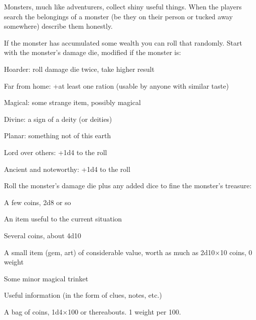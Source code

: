 Monsters, much like adventurers, collect shiny useful things. When the players search the belongings of a monster (be they on their person or tucked away somewhere) describe them honestly.

 

If the monster has accumulated some wealth you can roll that randomly. Start with the monster's damage die, modified if the monster is:

 
\startitemize[1,packed]

\item Hoarder: roll damage die twice, take higher result

 
\item Far from home: +at least one ration (usable by anyone with similar taste)

 
\item Magical: some strange item, possibly magical

 
\item Divine: a sign of a deity (or deities)

 
\item Planar: something not of this earth

 
\item Lord over others: +1d4 to the roll

 
\item Ancient and noteworthy: +1d4 to the roll


\stopitemize
 

Roll the monster's damage die plus any added dice to fine the monster's treasure:

 
\startitemize[n,packed]

\item A few coins, 2d8 or so

 
\item An item useful to the current situation

 
\item Several coins, about 4d10

 
\item A small item (gem, art) of considerable value, worth as much as 2d10×10 coins, 0 weight

 
\item Some minor magical trinket

 
\item Useful information (in the form of clues, notes, etc.)

 
\item A bag of coins, 1d4×100 or thereabouts. 1 weight per 100.

